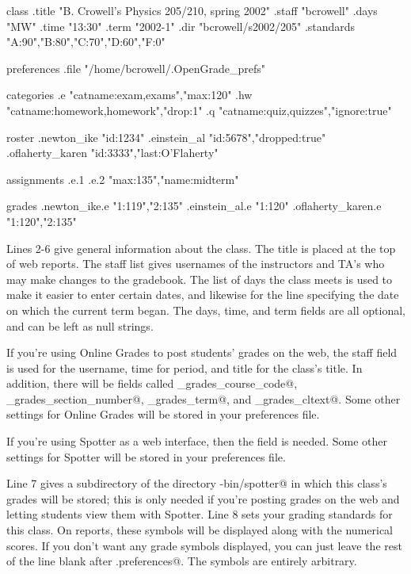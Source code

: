 \documentclass{opengrade_doc}
\begin{document}
\begin{listing}{1}
class
  .title "B. Crowell's Physics 205/210, spring 2002"
  .staff "bcrowell"
  .days "MW"
  .time "13:30"
  .term "2002-1"
  .dir   "bcrowell/s2002/205"
  .standards "A:90","B:80","C:70","D:60","F:0" 

preferences
  .file "/home/bcrowell/.OpenGrade_prefs"

categories
  .e "catname:exam,exams","max:120"
  .hw "catname:homework,homework","drop:1"
  .q "catname:quiz,quizzes","ignore:true"

roster
  .newton_ike "id:1234"
  .einstein_al "id:5678","dropped:true"
  .oflaherty_karen "id:3333","last:O'Flaherty"

assignments
  .e.1
  .e.2 "max:135","name:midterm"

grades
  .newton_ike.e "1:119","2:135"
  .einstein_al.e "1:120"
  .oflaherty_karen.e "1:120","2:135"
\end{listing}

Lines 2-6 give general information about the class. The title is
placed at the top of web reports. The staff list gives usernames
of the instructors and TA's who may make changes to the gradebook.
The list of
days the class meets is
used to make it easier to enter certain dates, and likewise for
the line specifying the date on which the current
term began.  The days, time, and term fields are all optional, and
can be left as null strings.

If you're using Online Grades to post students' grades on the web,
the staff field is used
for the username, time for period, and title for the class's title.
In addition, there will be fields called \verb@online_grades_course_code@,
\verb@online_grades_section_number@, \verb@online_grades_term@, and \verb@online_grades_cltext@.
Some other settings for Online Grades will be stored in your preferences file.

If you're using Spotter as a web interface, then the \verb@dir@ field
is needed.
Some other settings for Spotter will be stored in your preferences file.

Line 7 gives a subdirectory of the directory \verb@cgi-bin/spotter@
in which this class's
grades will be stored; this is only needed if you're posting grades
on the web and letting students view them with Spotter.
Line 8 sets your grading standards for this class. On reports, these
symbols will be displayed along with the numerical scores. If you
don't want any grade symbols displayed, you can just leave the rest of
the line blank after \verb@.preferences@. The symbols are entirely
arbitrary.
\end{document}
